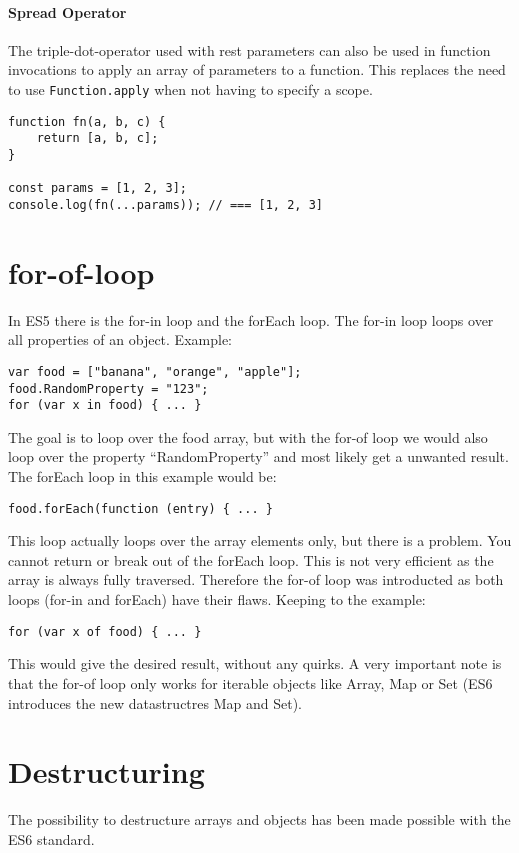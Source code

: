 \documentclass{bioinfo}
\begin{document}
\paragraph{Spread Operator}
The triple-dot-operator used with rest parameters can also be used in function invocations
to apply an array of parameters to a function. This replaces the need to use {\tt Function.apply}
when not having to specify a scope.

\begin{lstlisting}
function fn(a, b, c) {
    return [a, b, c];
}

const params = [1, 2, 3];
console.log(fn(...params)); // === [1, 2, 3]
\end{lstlisting}

\section{for-of-loop}
In ES5 there is the for-in loop and the forEach loop.
The for-in loop loops over all properties of an object. Example:

\begin{lstlisting}
var food = ["banana", "orange", "apple"];
food.RandomProperty = "123";
for (var x in food) { ... }
\end{lstlisting}

The goal is to loop over the food array, but with the for-of loop we would
also loop over the property “RandomProperty” and most likely get a unwanted result.
The forEach loop in this example would be:
\begin{lstlisting}
food.forEach(function (entry) { ... }
\end{lstlisting}
This loop actually loops over the array elements only, but there is a problem.
You cannot return or break out of the forEach loop. This is not very efficient
as the array is always fully traversed. Therefore the for-of loop was introducted
as both loops (for-in and forEach) have their flaws.
Keeping to the example:
\begin{lstlisting}
for (var x of food) { ... }
\end{lstlisting}

This would give the desired result, without any quirks. A very important note is
that the for-of loop only works for iterable objects like Array, Map or Set
(ES6 introduces the new datastructres Map and Set).

\section{Destructuring}
The possibility to destructure arrays and objects has been made possible with
the ES6 standard.
\end{document}
